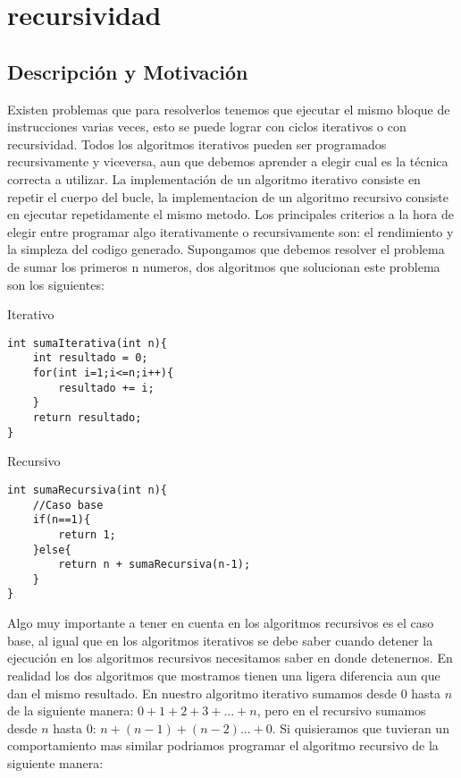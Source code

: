 \chapter{recursividad}
\section{Descripción y Motivación}

Existen problemas que para resolverlos tenemos que ejecutar el mismo bloque de instrucciones
varias veces, esto se puede lograr con ciclos iterativos o con recursividad. Todos los algoritmos
iterativos pueden ser programados recursivamente y viceversa, aun que debemos aprender a elegir
cual es la técnica correcta a utilizar. La implementación de un algoritmo iterativo consiste en repetir
el cuerpo del bucle, la implementacion de un algoritmo recursivo consiste en ejecutar repetidamente
el mismo metodo.
Los principales criterios a la hora de elegir entre programar algo iterativamente o recursivamente
son: el rendimiento y la simpleza del codigo generado.
Supongamos que debemos resolver el problema de sumar los primeros n numeros, dos algoritmos que
solucionan este problema son los siguientes:

\begin{minipage}{\textwidth}
Iterativo 
\begin{lstlisting}[style=C,caption=sumaIterativa.cpp]
int sumaIterativa(int n){
    int resultado = 0;
    for(int i=1;i<=n;i++){
        resultado += i;
    }
    return resultado;
}
\end{lstlisting}
\end{minipage}

	\begin{minipage}{\textwidth}
Recursivo
\begin{lstlisting}[style=C,caption=sumaRecursiva.cpp]
int sumaRecursiva(int n){
    //Caso base
    if(n==1){
        return 1;
    }else{
        return n + sumaRecursiva(n-1);
    }
}
\end{lstlisting}
\end{minipage}

Algo muy importante a tener en cuenta en los algoritmos recursivos es el caso base, al igual que
en los algoritmos iterativos se debe saber cuando detener la ejecución en los algoritmos recursivos
necesitamos saber en donde detenernos.
En realidad los dos algoritmos que mostramos tienen una ligera
diferencia aun que dan el mismo resultado. En nuestro algoritmo iterativo sumamos desde $0$ hasta $n$ de la
siguiente manera: $0+1+2+3+...+n$, pero en el recursivo sumamos desde $n$ hasta $0$: $n+(n-1)+(n-2)...+0$.
Si quisieramos que tuvieran un comportamiento mas similar podriamos programar el algoritmo recursivo
de la siguiente manera:

